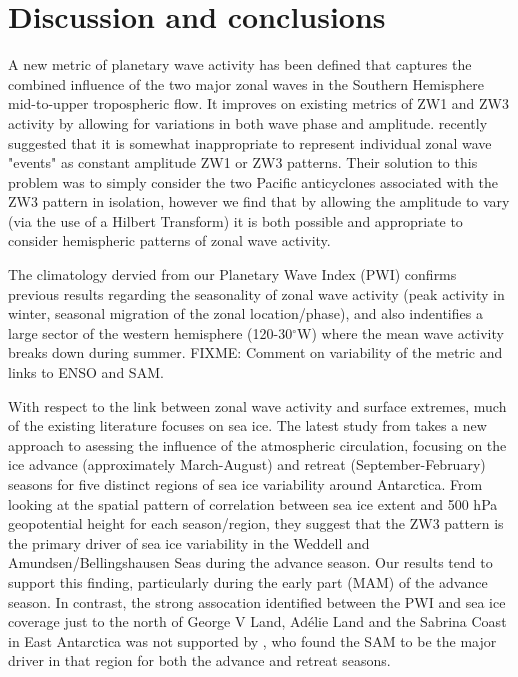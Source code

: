 \section{Discussion and conclusions}

A new metric of planetary wave activity has been defined that captures the combined influence of the two major zonal waves in the Southern Hemisphere mid-to-upper tropospheric flow. It improves on existing metrics of ZW1 and ZW3 activity by allowing for variations in both wave phase and amplitude. \citet{Hobbs2010} recently suggested that it is somewhat inappropriate to represent individual zonal wave "events" as constant amplitude ZW1 or ZW3 patterns. Their solution to this problem was to simply consider the two Pacific anticyclones associated with the ZW3 pattern in isolation, however we find that by allowing the amplitude to vary (via the use of a Hilbert Transform) it is both possible and appropriate to consider hemispheric patterns of zonal wave activity.  

The climatology dervied from our Planetary Wave Index (PWI) confirms previous results regarding the seasonality of zonal wave activity (peak activity in winter, seasonal migration of the zonal location/phase), and also indentifies a large sector of the western hemisphere (120-30$^{\circ}$W) where the mean wave activity breaks down during summer. FIXME: Comment on variability of the metric and links to ENSO and SAM.

With respect to the link between zonal wave activity and surface extremes, much of the existing literature focuses on sea ice. The latest study from \citet{Raphael2014} takes a new approach to asessing the influence of the atmospheric circulation, focusing on the ice advance (approximately March-August) and retreat (September-February) seasons for five distinct regions of sea ice variability around Antarctica. From looking at the spatial pattern of correlation between sea ice extent and 500 hPa geopotential height for each season/region, they suggest that the ZW3 pattern is the primary driver of sea ice variability in the Weddell and Amundsen/Bellingshausen Seas during the advance season. Our results tend to support this finding, particularly during the early part (MAM) of the advance season. In contrast, the strong assocation identified between the PWI and sea ice coverage just to the north of George V Land, Ad{\'e}lie Land and the Sabrina Coast in East Antarctica was not supported by \citet{Raphael2014}, who found the SAM to be the major driver in that region for both the advance and retreat seasons. 

